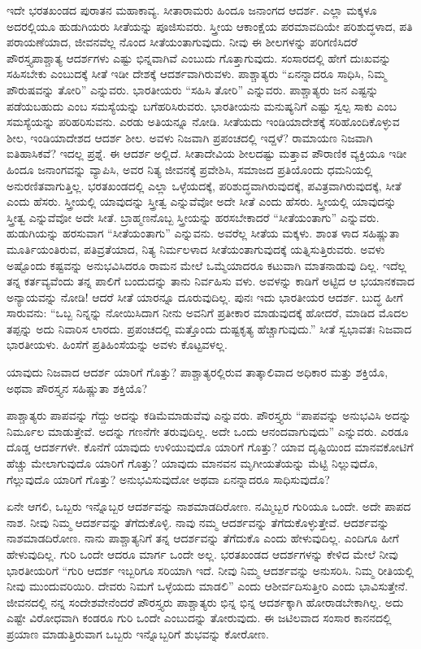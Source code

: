 ಇದೇ ಭರತಖಂಡದ ಪುರಾತನ ಮಹಾಕಾವ್ಯ. ಸೀತಾರಾಮರು ಹಿಂದೂ ಜನಾಂಗದ ಆದರ್ಶ. ಎಲ್ಲಾ ಮಕ್ಕಳೂ ಅದರಲ್ಲಿಯೂ ಹುಡುಗಿಯರು ಸೀತೆಯನ್ನು ಪೂಜಿಸುವರು. ಸ್ತ್ರೀಯ ಆಕಾಂಕ್ಷೆಯ ಪರಮಾವದಿಯೇ ಪರಿಶುದ್ಧಳಾದ, ಪತಿ ಪರಾಯಣೆಯಾದ, ಜೀವನವೆಲ್ಲ ನೊಂದ ಸೀತೆಯಂತಾಗುವುದು. ನೀವು ಈ ಶೀಲಗಳನ್ನು ಪರಿಗಣಿಸಿದರೆ ಪೌರಸ್ತ್ಯಪಾಶ್ಚಾತ್ಯ ಆದರ್ಶಗಳು ಎಷ್ಟು ಭಿನ್ನವಾಗಿವೆ ಎಂಬುದು ಗೊತ್ತಾಗುವುದು. ಸಂಸಾರದಲ್ಲಿ ಹೇಗೆ ದುಃಖವನ್ನು ಸಹಿಸಬೇಕು ಎಂಬುದಕ್ಕೆ ಸೀತೆ ಇಡೀ ದೇಶಕ್ಕೆ ಆದರ್ಶವಾಗಿರುವಳು. ಪಾಶ್ಚಾತ್ಯರು “ಏನನ್ನಾದರೂ ಸಾಧಿಸಿ, ನಿಮ್ಮ ಪೌರುಷವನ್ನು ತೋರಿ” ಎನ್ನುವರು. ಭಾರತೀಯರು “ಸಹಿಸಿ ತೋರಿ” ಎನ್ನುವರು. ಪಾಶ್ಚಾತ್ಯರು ಜನ ಎಷ್ಟನ್ನು ಪಡೆಯಬಹುದು ಎಂಬ ಸಮಸ್ಯೆಯನ್ನು ಬಗೆಹರಿಸಿರುವರು. ಭಾರತೀಯನು ಮನುಷ್ಯನಿಗೆ ಎಷ್ಟು ಸ್ವಲ್ಪ ಸಾಕು ಎಂಬ ಸಮಸ್ಯೆಯನ್ನು ಪರಿಹರಿಸುವನು. ಎರಡು ಅತಿಯನ್ನೂ ನೋಡಿ. ಸೀತೆಯದು ಇಂಡಿಯಾದೇಶಕ್ಕೆ ಸರಿಹೊಂದಿಕೊಳ್ಳುವ ಶೀಲ, ಇಂಡಿಯಾದೇಶದ ಆದರ್ಶ ಶೀಲ. ಅವಳು ನಿಜವಾಗಿ ಪ್ರಪಂಚದಲ್ಲಿ ಇದ್ದಳೆ? ರಾಮಾಯಣ ನಿಜವಾಗಿ ಐತಿಹಾಸಿಕವೆ? ಇದಲ್ಲ ಪ್ರಶ್ನೆ. ಈ ಆದರ್ಶ ಅಲ್ಲಿದೆ. ಸೀತಾದೇವಿಯ ಶೀಲದಷ್ಟು ಮತ್ತಾವ ಪೌರಾಣಿಕ ವ್ಯಕ್ತಿಯೂ ಇಡೀ ಹಿಂದೂ ಜನಾಂಗವನ್ನು ವ್ಯಾಪಿಸಿ, ಅವರ ನಿತ್ಯ ಜೀವನಕ್ಕೆ ಪ್ರವೇಶಿಸಿ, ಸಮಾಜದ ಪ್ರತಿಯೊಂದು ಧಮನಿಯಲ್ಲಿ ಅನುರಣಿತವಾಗುತ್ತಿಲ್ಲ. ಭರತಖಂಡದಲ್ಲಿ ಎಲ್ಲಾ ಒಳ್ಳೆಯದಕ್ಕೆ, ಪರಿಶುದ್ಧವಾಗಿರುವುದಕ್ಕೆ, ಪವಿತ್ರವಾಗಿರುವುದಕ್ಕೆ, ಸೀತೆ ಎಂದು ಹೆಸರು. ಸ್ತ್ರೀಯಲ್ಲಿ ಯಾವುದನ್ನು ಸ್ತ್ರೀತ್ವ ಎನ್ನುವೆವೋ ಅದೇ ಸೀತೆ ಎಂದು ಹೆಸರು. ಸ್ತ್ರೀಯಲ್ಲಿ ಯಾವುದನ್ನು ಸ್ತ್ರೀತ್ವ ಎನ್ನುವೆವೋ ಅದೇ ಸೀತೆ. ಬ್ರಾಹ್ಮಣನೊಬ್ಬ ಸ್ತ್ರೀಯನ್ನು ಹರಸಬೇಕಾದರೆ “ಸೀತೆಯಂತಾಗು” ಎನ್ನುವರು. ಹುಡುಗಿಯನ್ನು ಹರಸುವಾಗ “ಸೀತೆಯಂತಾಗು” ಎನ್ನುವನು. ಅವರೆಲ್ಲ ಸೀತೆಯ ಮಕ್ಕಳು. ಶಾಂತ ಳಾದ ಸಹಿಷ್ಣುತಾ ಮೂರ್ತಿಯಂತಿರುವ, ಪತಿವ್ರತೆಯಾದ, ನಿತ್ಯ ನಿರ್ಮಲಳಾದ ಸೀತೆಯಂತಾಗುವುದಕ್ಕೆ ಯತ್ನಿಸುತ್ತಿರುವರು. ಅವಳು ಅಷ್ಟೊಂದು ಕಷ್ಟವನ್ನು ಅನುಭವಿಸಿದರೂ ರಾಮನ ಮೇಲೆ ಒಮ್ಮೆಯಾದರೂ ಕಟುವಾಗಿ ಮಾತನಾಡುವು ದಿಲ್ಲ. ಇದೆಲ್ಲ ತನ್ನ ಕರ್ತವ್ಯವೆಂದು ತನ್ನ ಪಾಲಿಗೆ ಬಂದುದನ್ನು ತಾನು ನಿರ್ವಹಿಸು ವಳು. ಅವಳನ್ನು ಕಾಡಿಗೆ ಅಟ್ಟಿದ ಆ ಭಯಾನಕವಾದ ಅನ್ಯಾಯವನ್ನು ನೋಡಿ! ಆದರೆ ಸೀತೆ ಯಾರನ್ನೂ ದೂರುವುದಿಲ್ಲ. ಪುನಃ ಇದು ಭಾರತೀಯರ ಆದರ್ಶ. ಬುದ್ಧ ಹೀಗೆ ಸಾರುವನು: “ಒಬ್ಬ ನಿನ್ನನ್ನು ನೋಯಿಸಿದಾಗ ನೀನು ಅವನಿಗೆ ಪ್ರತೀಕಾರ ಮಾಡುವುದಕ್ಕೆ ಹೋದರೆ, ಮಾಡಿದ ಮೊದಲ ತಪ್ಪನ್ನು ಅದು ನಿವಾರಿಸ ಲಾರದು. ಪ್ರಪಂಚದಲ್ಲಿ ಮತ್ತೊಂದು ದುಷ್ಟಕೃತ್ಯ ಹೆಚ್ಚಾಗುವುದು.” ಸೀತೆ ಸ್ವಭಾವತಃ ನಿಜವಾದ ಭಾರತೀಯಳು. ಹಿಂಸೆಗೆ ಪ್ರತಿಹಿಂಸೆಯನ್ನು ಅವಳು ಕೊಟ್ಟವಳಲ್ಲ.

ಯಾವುದು ನಿಜವಾದ ಆದರ್ಶ ಯಾರಿಗೆ ಗೊತ್ತು? ಪಾಶ್ಚಾತ್ಯರಲ್ಲಿರುವ ತಾತ್ಕಾಲಿವಾದ ಅಧಿಕಾರ ಮತ್ತು ಶಕ್ತಿಯೊ, ಅಥವಾ ಪೌರಸ್ತ್ಯನ ಸಹಿಷ್ಣುತಾ ಶಕ್ತಿಯೊ?

ಪಾಶ್ಚಾತ್ಯರು ಪಾಪವನ್ನು ಗೆದ್ದು ಅದನ್ನು ಕಡಿಮೆಮಾಡುವೆವು ಎನ್ನುವರು. ಪೌರಸ್ತ್ಯರು “ಪಾಪವನ್ನು ಅನುಭವಿಸಿ ಅದನ್ನು ನಿರ್ಮೂಲ ಮಾಡುತ್ತೇವೆ. ಅದನ್ನು ಗಣನೆಗೇ ತರುವುದಿಲ್ಲ. ಅದೇ ಒಂದು ಆನಂದವಾಗುವುದು” ಎನ್ನುವರು. ಎರಡೂ ದೊಡ್ಡ ಆದರ್ಶಗಳೇ. ಕೊನೆಗೆ ಯಾವುದು ಉಳಿಯುವುದೊ ಯಾರಿಗೆ ಗೊತ್ತು? ಯಾವ ದೃಷ್ಟಿಯಿಂದ ಮಾನವಕೋಟಿಗೆ ಹೆಚ್ಚು ಮೇಲಾಗುವುದೊ ಯಾರಿಗೆ ಗೊತ್ತು? ಯಾವುದು ಮಾನವನ ಮೃಗೀಯತೆಯನ್ನು ಮೆಟ್ಟಿ ನಿಲ್ಲುವುದೊ, ಗೆಲ್ಲುವುದೊ ಯಾರಿಗೆ ಗೊತ್ತು? ಅನುಭವಿಸುವುದೋ ಅಥವಾ ಏನನ್ನಾದರೂ ಸಾಧಿಸುವುದೊ?

ಏನೇ ಆಗಲಿ, ಒಬ್ಬರು ಇನ್ನೊಬ್ಬರ ಆದರ್ಶವನ್ನು ನಾಶಮಾಡದಿರೋಣ. ನಮ್ಮಿಬ್ಬರ ಗುರಿಯೂ ಒಂದೇ. ಅದೇ ಪಾಪದ ನಾಶ. ನೀವು ನಿಮ್ಮ ಆದರ್ಶವನ್ನು ತೆಗೆದುಕೊಳ್ಳಿ. ನಾವು ನಮ್ಮ ಆದರ್ಶವನ್ನು ತೆಗೆದುಕೊಳ್ಳುತ್ತೇವೆ. ಆದರ್ಶವನ್ನು ನಾಶಮಾಡದಿರೋಣ. ನಾನು ಪಾಶ್ಚಾತ್ಯನಿಗೆ ತನ್ನ ಆದರ್ಶವನ್ನು ತೆಗೆದುಕೊ ಎಂದು ಹೇಳುವುದಿಲ್ಲ. ಎಂದಿಗೂ ಹೀಗೆ ಹೇಳುವುದಿಲ್ಲ. ಗುರಿ ಒಂದೇ ಆದರೂ ಮಾರ್ಗ ಒಂದೇ ಅಲ್ಲ. ಭರತಖಂಡದ ಆದರ್ಶಗಳನ್ನು ಕೇಳಿದ ಮೇಲೆ ನೀವು ಭಾರತೀಯರಿಗೆ “ಗುರಿ ಆದರ್ಶ ಇಬ್ಬರಿಗೂ ಸರಿಯಾಗಿ ಇದೆ. ನೀವು ನಿಮ್ಮ ಆದರ್ಶವನ್ನು ಅನುಸರಿಸಿ. ನಿಮ್ಮ ರೀತಿಯಲ್ಲಿ ನೀವು ಮುಂದುವರಿಯಿರಿ. ದೇವರು ನಿಮಗೆ ಒಳ್ಳೆಯದು ಮಾಡಲಿ” ಎಂದು ಆಶೀರ್ವದಿಸುತ್ತೀರಿ ಎಂದು ಭಾವಿಸುತ್ತೇನೆ. ಜೀವನದಲ್ಲಿ ನನ್ನ ಸಂದೇಶವೇನೆಂದರೆ ಪೌರಸ್ತ್ಯರು ಪಾಶ್ಚಾತ್ಯರು ಭಿನ್ನ ಭಿನ್ನ ಆದರ್ಶಕ್ಕಾಗಿ ಹೋರಾಡಬೇಕಾಗಿಲ್ಲ. ಅದು ಎಷ್ಟೇ ವಿರೋಧವಾಗಿ ಕಂಡರೂ ಗುರಿ ಒಂದೇ ಎಂಬುದನ್ನು ತೋರುವುದು. ಈ ಜಟಿಲವಾದ ಸಂಸಾರ ಕಾನನದಲ್ಲಿ ಪ್ರಯಾಣ ಮಾಡುತ್ತಿರುವಾಗ ಒಬ್ಬರು ಇನ್ನೊಬ್ಬರಿಗೆ ಶುಭವನ್ನು ಕೋರೋಣ.

